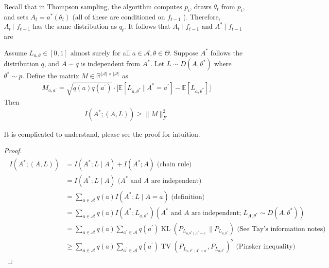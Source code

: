 \documentclass{article}
\begin{document}
Recall that in Thompson sampling, the algorithm computes $p_{t}$, draws $\theta_{t}$ from $p_{t}$, and sets $A_{t}=a^{*}\left(\theta_{t}\right)$ (all of these are conditioned on $f_{t-1}$ ). Therefore, $A_{t} \mid f_{t-1}$ has the same distribution as $q_{t}$. It follows that $A_{t} \mid f_{t-1}$ and $A^{*} \mid f_{t-1}$ are 


\begin{lema}
  Assume $L_{a, \theta} \in[0,1]$ almost surely for all $a \in \mathcal{A}, \theta \in \Theta$. Suppose $A^{*}$ follows the distribution $q$, and $A \sim q$ is independent from $A^{*} .$ Let $L \sim D\left(A, \theta^{*}\right)$ where $\theta^{*} \sim p .$ Define the matrix $M \in \mathbb{R}^{|\mathcal{A}| \times|\mathcal{A}|}$ as
\begin{align*}
M_{a, a^{\prime}}=\sqrt{q(a) q\left(a^{\prime}\right)} \cdot\bigg[\mathbb{E}\left[L_{a, \theta^{*}} \mid A^{*}=a^{\prime}\right]-\mathbb{E}\left[L_{a, \theta^{*}}\right]\bigg]
\end{align*}
Then
\begin{align*}
I\left(A^{*} ;(A, L)\right) \geq\|M\|_{F}^{2}
\end{align*}
\end{lema} 
\begin{rema}\label{lem:iaerad}
It is complicated to understand, please see the proof for intuition.
\end{rema}
\begin{proof}
\begin{align*}
\begin{aligned}
I\left(A^{*} ;(A, L)\right) &=I\left(A^{*} ; L \mid A\right)+I\left(A^{*} ; A\right) \text { (chain rule) } \\
&=I\left(A^{*} ; L \mid A\right)\text { ($A^{*}$ and  $A$ are independent)} \\
&=\sum_{a \in \mathcal{A}} q(a) I\left(A^{*} ; L \mid A=a\right) \text { (definition) } \\
&=\sum_{a \in \mathcal{A}} q(a) I\left(A^{*} ; L_{a, \theta^{*}}\right)\left(A^{*} \text { and } A \text { are independent; } L_{A, \theta^{*}} \sim D\left(A, \theta^{*}\right)\right) \\
&=\sum_{a \in \mathcal{A}} q(a) \sum_{a^{\prime} \in \mathcal{A}} q\left(a^{\prime}\right) \operatorname{KL}\left(P_{L_{a, \theta^{*} \mid A^{*}=a^{\prime}}} \| P_{L_{a, \theta^{*}}}\right) \text { (See Tay's information notes) } \\
& \geq \sum_{a \in \mathcal{A}} q(a) \sum_{a^{\prime} \in \mathcal{A}} q\left(a^{\prime}\right) \operatorname{TV}\left(P_{L_{a, \theta^{*} \mid A^{*}=a^{\prime}}}, P_{L_{a, \theta^{*}}}\right)^{2} \text { (Pinsker inequality) }
\end{aligned}
\end{align*}

\end{proof}
\end{document}
